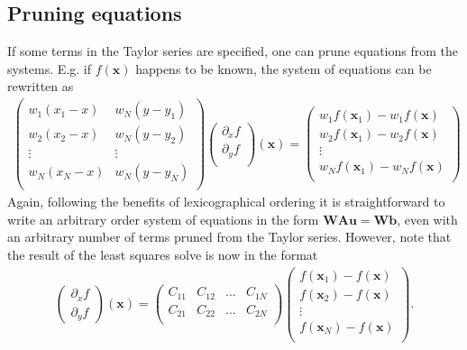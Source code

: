 \documentclass[letterpaper,10pt,english]{sphinxmanual}
\begin{document}
\subsection{Pruning equations}
\label{\detokenize{Utilities/LeastSquares:pruning-equations}}
If some terms in the Taylor series are specified, one can prune equations from the systems.
E.g. if \(f\left(\mathbf{x}\right)\) happens to be known, the system of equations can be rewritten as
\begin{equation*}
\begin{split}\begin{pmatrix}
w_1(x_1 - x) & w_N(y - y_1) \\
w_2(x_2 - x) & w_N(y - y_2) \\
\vdots & \vdots \\
w_N(x_N - x) & w_N(y - y_N) \\
\end{pmatrix}
\begin{pmatrix}
\partial_x f \\
\partial_y f \\
\end{pmatrix}(\mathbf{x})
=
\begin{pmatrix}
w_1f(\mathbf{x}_1) - w_1f(\mathbf{x})  \\
w_2f(\mathbf{x}_1) - w_2f(\mathbf{x})  \\
\vdots \\
w_Nf(\mathbf{x}_1) - w_Nf(\mathbf{x})  \\
\end{pmatrix}\end{split}
\end{equation*}
Again, following the benefits of lexicographical ordering it is straightforward to write an arbitrary order system of equations in the form \(\mathbf{W}\mathbf{A}\mathbf{u} = \mathbf{W}\mathbf{b}\), even with an arbitrary number of terms pruned from the Taylor series.
However, note that the result of the least squares solve is now in the format
\begin{equation*}
\begin{split}\begin{pmatrix}
\partial_x f \\
\partial_y f
\end{pmatrix}(\mathbf{x})
=
\begin{pmatrix}
C_{11} & C_{12} & \ldots & C_{1N} \\
C_{21} & C_{22} & \ldots & C_{2N} \\
\end{pmatrix}
\begin{pmatrix}
f(\mathbf{x}_1) - f(\mathbf{x}) \\
f(\mathbf{x}_2) - f(\mathbf{x}) \\
\vdots \\
f(\mathbf{x}_N) - f(\mathbf{x}) \\
\end{pmatrix}.\end{split}
\end{equation*}
\end{document}
